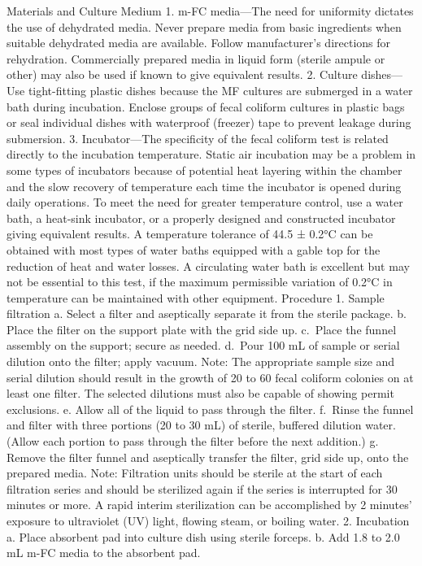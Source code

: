 \documentclass{article}
\begin{document}
Materials and Culture Medium 1. m-FC media---The need for uniformity
dictates the use of dehydrated media. Never prepare media from basic
ingredients when suitable dehydrated media are available. Follow
manufacturer's directions for rehydration. Commercially prepared media
in liquid form (sterile ampule or other) may also be used if known to
give equivalent results. 2. Culture dishes---Use tight-fitting plastic
dishes because the MF cultures are submerged in a water bath during
incubation. Enclose groups of fecal coliform cultures in plastic bags or
seal individual dishes with waterproof (freezer) tape to prevent leakage
during submersion. 3. Incubator---The specificity of the fecal coliform
test is related directly to the incubation temperature. Static air
incubation may be a problem in some types of incubators because of
potential heat layering within the chamber and the slow recovery of
temperature each time the incubator is opened during daily operations.
To meet the need for greater temperature control, use a water bath, a
heat-sink incubator, or a properly designed and constructed incubator
giving equivalent results. A temperature tolerance of 44.5 ± 0.2°C can
be obtained with most types of water baths equipped with a gable top for
the reduction of heat and water losses. A circulating water bath is
excellent but may not be essential to this test, if the maximum
permissible variation of 0.2°C in temperature can be maintained with
other equipment. Procedure 1. Sample filtration a. Select a filter and
aseptically separate it from the sterile package. b. Place the filter on
the support plate with the grid side up. c.~Place the funnel assembly on
the support; secure as needed. d.~Pour 100 mL of sample or serial
dilution onto the filter; apply vacuum. Note: The appropriate sample
size and serial dilution should result in the growth of 20 to 60 fecal
coliform colonies on at least one filter. The selected dilutions must
also be capable of showing permit exclusions. e. Allow all of the liquid
to pass through the filter. f.~Rinse the funnel and filter with three
portions (20 to 30 mL) of sterile, buffered dilution water. (Allow each
portion to pass through the filter before the next addition.) g. Remove
the filter funnel and aseptically transfer the filter, grid side up,
onto the prepared media. Note: Filtration units should be sterile at the
start of each filtration series and should be sterilized again if the
series is interrupted for 30 minutes or more. A rapid interim
sterilization can be accomplished by 2 minutes' exposure to ultraviolet
(UV) light, flowing steam, or boiling water. 2. Incubation a. Place
absorbent pad into culture dish using sterile forceps. b. Add 1.8 to 2.0
mL m-FC media to the absorbent pad.
\end{document}
